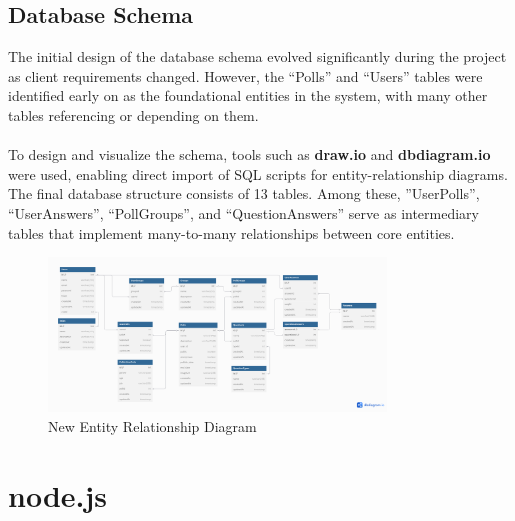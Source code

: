 \documentclass[a4paper,12pt]{report}
\begin{document}
\subsection{Database Schema}
The initial design of the database schema evolved significantly during the project as client requirements changed. However, the “Polls” and “Users” tables were identified early on as the foundational entities in the system, with many other tables referencing or depending on them.\\\\
To design and visualize the schema, tools such as \textbf{draw.io} and \textbf{dbdiagram.io} were used, enabling direct import of SQL scripts for entity-relationship diagrams. The final database structure consists of 13 tables. Among these, ”UserPolls”, “UserAnswers”, “PollGroups”, and “QuestionAnswers” serve as intermediary tables that implement many-to-many relationships between core entities.
\begin{figure}[H]	
	\centering	
	\includegraphics[width=0.8\textwidth]{pics/new_ERD.png}	
	\caption{New Entity Relationship Diagram}	
	\label{fig:new_ERD}
\end{figure}
\section{node.js}
\end{document}
